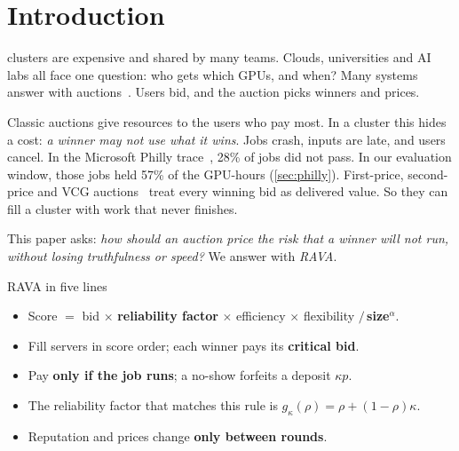 \documentclass[journal]{IEEEtran}
\theoremstyle{remark}
\begin{document}
\section{Introduction}
 clusters are expensive and shared by many teams. Clouds, universities and AI labs all face one question: who gets which GPUs, and when? Many systems answer with auctions~\cite{buyya2002,luong2017,parsons2011,mahajan2020themis}. Users bid, and the auction picks winners and prices.

Classic auctions give resources to the users who pay most. In a cluster this hides a cost: \emph{a winner may not use what it wins}. Jobs crash, inputs are late, and users cancel. In the Microsoft Philly trace~\cite{jeon2019philly}, 28\% of jobs did not pass. In our evaluation window, those jobs held 57\% of the GPU-hours (\cref{sec:philly}). First-price, second-price and VCG auctions~\cite{vickrey1961,clarke1971,groves1973} treat every winning bid as delivered value. So they can fill a cluster with work that never finishes.

This paper asks: \emph{how should an auction price the risk that a winner will not run, without losing truthfulness or speed?} We answer with \emph{RAVA}.

\begin{keybox}{RAVA in five lines}
\begin{itemize}\setlength\itemsep{1pt}
\item Score $=$ bid $\times$ \textbf{reliability factor} $\times$ efficiency $\times$ flexibility $/\,$\textbf{size}$^{\alpha}$.
\item Fill servers in score order; each winner pays its \textbf{critical bid}.
\item Pay \textbf{only if the job runs}; a no-show forfeits a deposit $\kappa p$.
\item The reliability factor that matches this rule is $g_\kappa(\rho)=\rho+(1-\rho)\kappa$.
\item Reputation and prices change \textbf{only between rounds}.
\end{itemize}
\end{keybox}
\end{document}
